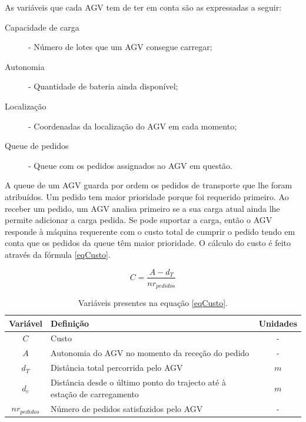 \begin{titlepage}
As variáveis que cada AGV tem de ter em conta são as expressadas a seguir:

\begin{description}
\item[Capacidade de carga] - Número de lotes que um AGV consegue carregar;
\item[Autonomia] - Quantidade de bateria ainda disponível;
\item[Localização] - Coordenadas da localização do AGV em cada momento;
\item[Queue de pedidos] - Queue com os pedidos assignados ao AGV em questão.
\end{description}

A queue de um AGV guarda por ordem os pedidos de transporte que lhe foram atribuídos. Um pedido tem maior prioridade porque foi requerido primeiro. Ao receber um pedido, um AGV analisa primeiro se a sua carga atual ainda lhe permite adicionar a carga pedida. Se pode suportar a carga, então o AGV responde à máquina requerente com o custo total de cumprir o pedido tendo em conta que os pedidos da queue têm maior prioridade. O cálculo do custo é feito através da fórmula \ref{eqCusto}.

\begin{equation}
C = \frac{A-d_{T}}{nr_{pedidos}}
\label{eqCusto}
\end{equation}

\begin{table}[H]
\centering
\caption{Variáveis presentes na equação \ref{eqCusto}.}
\label{my-label}
\begin{tabular}{@{}p{2cm}ll@{}}
\toprule
\multicolumn{1}{c}{\textbf{Variável}} & \textbf{Definição}   & \multicolumn{1}{c}{\textbf{Unidades}} \\ \midrule
\multicolumn{1}{c}{$C$} & Custo &  \multicolumn{1}{c}{-}  \\ \midrule
\multicolumn{1}{c}{$A$} & Autonomia do AGV no momento da receção do pedido &  \multicolumn{1}{c}{-}  \\ \midrule
\multicolumn{1}{c}{$d_{T}$} & Distância total percorrida pelo AGV   & \multicolumn{1}{c}{$m$} \\ \midrule
\multicolumn{1}{c}{$d_{e}$} & Distância desde o último ponto do trajecto até à estação de carregamento & \multicolumn{1}{c}{$m$} \\ \midrule
\multicolumn{1}{c}{$nr_{pedidos}$} & Número de pedidos satisfazidos pelo AGV  & \multicolumn{1}{c}{-} \\ \bottomrule
\end{tabular}
\end{table}


\end{titlepage}
